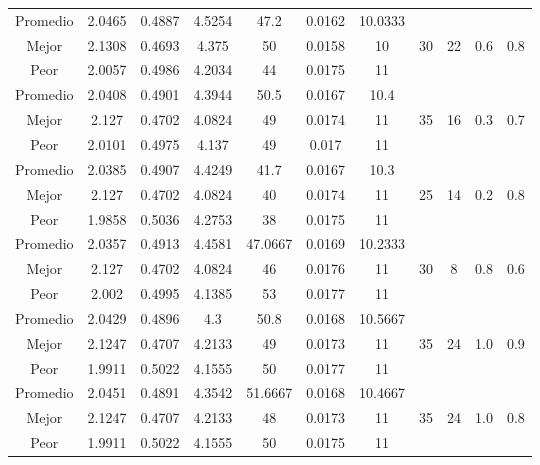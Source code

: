 \begin{table}[h!]
\begin{center}
\begin{tabular}{|c|c|c|c|c|c|c|c|c|c|c|}
        \hline
        \hline
            Promedio  & 2.0465 & 0.4887 & 4.5254 & 47.2 & 0.0162 & 10.0333 &  &  &  & \\
            \cline{1-7}
            Mejor & 2.1308 & 0.4693  & 4.375 & 50 & 0.0158 & 10 & 30 & 22 & 0.6 & 0.8\\
            \cline{1-7}
            Peor & 2.0057 & 0.4986  & 4.2034 & 44 & 0.0175 & 11 &  &  &  & \\
        \hline
        \hline
            Promedio  & 2.0408 & 0.4901 & 4.3944 & 50.5 & 0.0167 & 10.4 &  &  &  & \\
            \cline{1-7}
            Mejor & 2.127 & 0.4702  & 4.0824 & 49 & 0.0174 & 11 & 35 & 16 & 0.3 & 0.7\\
            \cline{1-7}
            Peor & 2.0101 & 0.4975  & 4.137 & 49 & 0.017 & 11 &  &  &  & \\
        \hline
        \hline
            Promedio  & 2.0385 & 0.4907 & 4.4249 & 41.7 & 0.0167 & 10.3 &  &  &  & \\
            \cline{1-7}
            Mejor & 2.127 & 0.4702  & 4.0824 & 40 & 0.0174 & 11 & 25 & 14 & 0.2 & 0.8\\
            \cline{1-7}
            Peor & 1.9858 & 0.5036  & 4.2753 & 38 & 0.0175 & 11 &  &  &  & \\
        \hline
        \hline
            Promedio  & 2.0357 & 0.4913 & 4.4581 & 47.0667 & 0.0169 & 10.2333 &  &  &  & \\
            \cline{1-7}
            Mejor & 2.127 & 0.4702  & 4.0824 & 46 & 0.0176 & 11 & 30 & 8 & 0.8 & 0.6\\
            \cline{1-7}
            Peor & 2.002 & 0.4995  & 4.1385 & 53 & 0.0177 & 11 &  &  &  & \\
        \hline
        \hline
            Promedio  & 2.0429 & 0.4896 & 4.3 & 50.8 & 0.0168 & 10.5667 &  &  &  & \\
            \cline{1-7}
            Mejor & 2.1247 & 0.4707  & 4.2133 & 49 & 0.0173 & 11 & 35 & 24 & 1.0 & 0.9\\
            \cline{1-7}
            Peor & 1.9911 & 0.5022  & 4.1555 & 50 & 0.0177 & 11 &  &  &  & \\
        \hline
        \hline
            Promedio  & 2.0451 & 0.4891 & 4.3542 & 51.6667 & 0.0168 & 10.4667 &  &  &  & \\
            \cline{1-7}
            Mejor & 2.1247 & 0.4707  & 4.2133 & 48 & 0.0173 & 11 & 35 & 24 & 1.0 & 0.8\\
            \cline{1-7}
            Peor & 1.9911 & 0.5022  & 4.1555 & 50 & 0.0175 & 11 &  &  &  & \\

\end{tabular}
\end{center}
\end{table}
